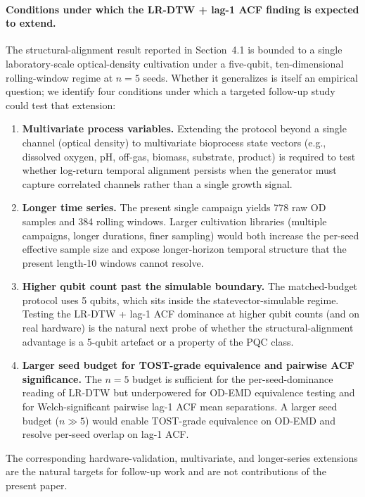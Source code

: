 \documentclass[12pt,twocolumn]{article}
\begin{document}
\paragraph{Conditions under which the LR-DTW + lag-1 ACF finding is expected to extend.}
The structural-alignment result reported in Section~4.1 is bounded to a
single laboratory-scale optical-density cultivation under a five-qubit,
ten-dimensional rolling-window regime at $n=5$ seeds. Whether it
generalizes is itself an empirical question; we identify four conditions
under which a targeted follow-up study could test that extension:
\begin{enumerate}[nosep, leftmargin=*]
  \item \textbf{Multivariate process variables.} Extending the protocol
    beyond a single channel (optical density) to multivariate bioprocess
    state vectors (e.g., dissolved oxygen, pH, off-gas, biomass,
    substrate, product) is required to test whether log-return temporal
    alignment persists when the generator must capture correlated
    channels rather than a single growth signal.
  \item \textbf{Longer time series.} The present single campaign yields
    778 raw OD samples and 384 rolling windows. Larger cultivation
    libraries (multiple campaigns, longer durations, finer sampling)
    would both increase the per-seed effective sample size and expose
    longer-horizon temporal structure that the present length-10
    windows cannot resolve.
  \item \textbf{Higher qubit count past the simulable boundary.} The
    matched-budget protocol uses 5 qubits, which sits inside the
    statevector-simulable regime. Testing the LR-DTW + lag-1 ACF
    dominance at higher qubit counts (and on real hardware) is the
    natural next probe of whether the structural-alignment advantage
    is a 5-qubit artefact or a property of the PQC class.
  \item \textbf{Larger seed budget for TOST-grade equivalence and
    pairwise ACF significance.} The $n=5$ budget is sufficient for the
    per-seed-dominance reading of LR-DTW but underpowered for OD-EMD
    equivalence testing and for Welch-significant pairwise lag-1 ACF
    mean separations. A larger seed budget ($n \gg 5$) would enable
    TOST-grade equivalence on OD-EMD and resolve per-seed overlap on
    lag-1 ACF.
\end{enumerate}
The corresponding hardware-validation, multivariate, and longer-series
extensions are the natural targets for follow-up work and are not
contributions of the present paper.
\end{document}
